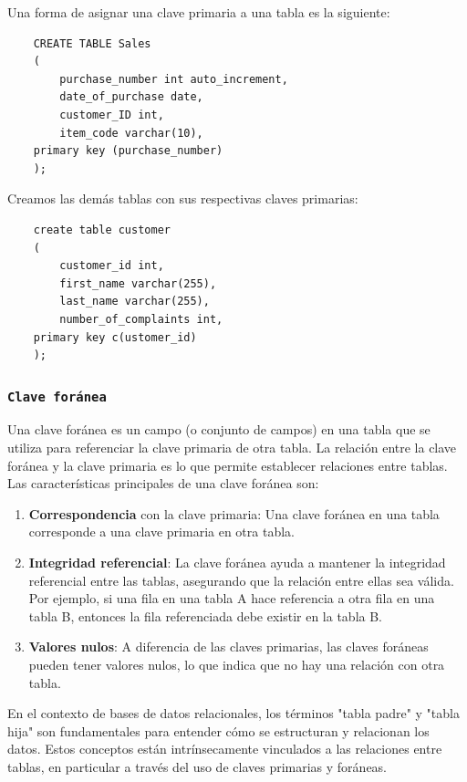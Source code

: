     Una forma de asignar una clave primaria a una tabla es la siguiente:

    \begin{verbatim}
    CREATE TABLE Sales
    (
        purchase_number int auto_increment,
        date_of_purchase date,
        customer_ID int,
        item_code varchar(10),
    primary key (purchase_number)
    );
    \end{verbatim}
    
    
    Creamos las demás tablas con sus respectivas claves primarias:
    
    \begin{verbatim}
    create table customer
    (
        customer_id int,
        first_name varchar(255),
        last_name varchar(255),
        number_of_complaints int,
    primary key c(ustomer_id)
    );
    \end{verbatim}
    \subsubsection{\texttt{Clave foránea}}

    Una clave foránea es un campo (o conjunto de campos) en una tabla que se utiliza para referenciar la clave primaria de otra tabla. La relación entre la clave foránea y la clave primaria es lo que permite establecer relaciones entre tablas. Las características principales de una clave foránea son: 

    \begin{enumerate}
        \item \textbf{Correspondencia} con la clave primaria: Una clave foránea en una tabla corresponde a una clave primaria en otra tabla.
        \item \textbf{Integridad referencial}: La clave foránea ayuda a mantener la integridad referencial entre las tablas, asegurando que la relación entre ellas sea válida. Por ejemplo, si una fila en una tabla A hace referencia a otra fila en una tabla B, entonces la fila referenciada debe existir en la tabla B.
        \item \textbf{Valores nulos}: A diferencia de las claves primarias, las claves foráneas pueden tener valores nulos, lo que indica que no hay una relación con otra tabla.
    \end{enumerate}

    En el contexto de bases de datos relacionales, los términos "tabla padre" y "tabla hija" son fundamentales para entender cómo se estructuran y relacionan los datos. Estos conceptos están intrínsecamente vinculados a las relaciones entre tablas, en particular a través del uso de claves primarias y foráneas.

